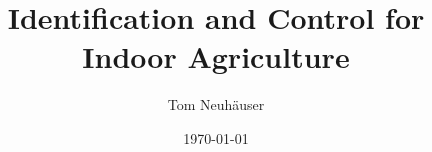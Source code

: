 \documentclass{beamer}
\title{Identification and Control for Indoor Agriculture}
\author{Tom Neuh\"auser}
\date{\today}
\begin{document}
\frame{\titlepage}






\end{document}
